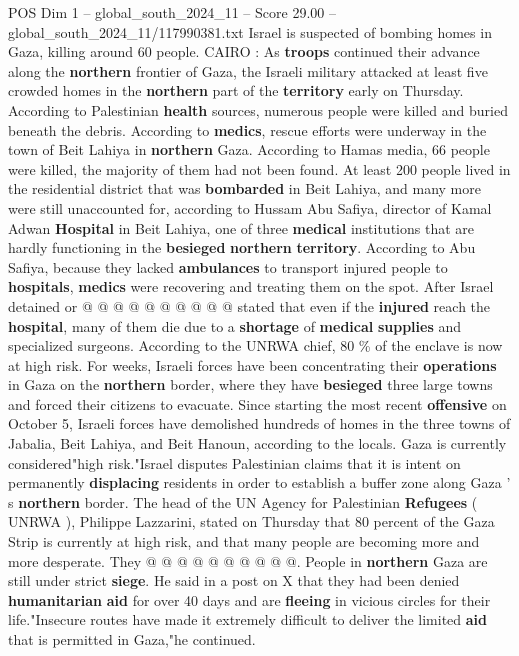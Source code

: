 \begin{textsample}{POS Dim 1 – global\_south\_2024\_11 – Score 29.00 – global\_south\_2024\_11/117990381.txt}  \label{ex:f1_pos_250}
Israel is suspected of bombing homes in Gaza, killing around 60 people.
CAIRO : As \textbf{troops} continued their advance along the \textbf{northern} frontier of Gaza, the Israeli military attacked at least five crowded homes in the \textbf{northern} part of the \textbf{territory} early on Thursday.
According to Palestinian \textbf{health} sources, numerous people were killed and buried beneath the debris.
According to \textbf{medics}, rescue efforts were underway in the town of Beit Lahiya in \textbf{northern} Gaza.
According to Hamas media, 66 people were killed, the majority of them had not been found.
At least 200 people lived in the residential district that was \textbf{bombarded} in Beit Lahiya, and many more were still unaccounted for, according to Hussam Abu Safiya, director of Kamal Adwan \textbf{Hospital} in Beit Lahiya, one of three \textbf{medical} institutions that are hardly functioning in the \textbf{besieged} \textbf{northern} \textbf{territory}.
According to Abu Safiya, because they lacked \textbf{ambulances} to transport injured people to \textbf{hospitals}, \textbf{medics} were recovering and treating them on the spot.
After Israel detained or @ @ @ @ @ @ @ @ @ @ stated that even if the \textbf{injured} reach the \textbf{hospital}, many of them die due to a \textbf{shortage} of \textbf{medical} \textbf{supplies} and specialized surgeons.
According to the UNRWA chief, 80 \% of the enclave is now at high risk.
For weeks, Israeli forces have been concentrating their \textbf{operations} in Gaza on the \textbf{northern} border, where they have \textbf{besieged} three large towns and forced their citizens to evacuate.
Since starting the most recent \textbf{offensive} on October 5, Israeli forces have demolished hundreds of homes in the three towns of Jabalia, Beit Lahiya, and Beit Hanoun, according to the locals.
Gaza is currently considered"high risk."Israel disputes Palestinian claims that it is intent on permanently \textbf{displacing} residents in order to establish a buffer zone along Gaza ' s \textbf{northern} border.
The head of the UN Agency for Palestinian \textbf{Refugees} ( UNRWA ), Philippe Lazzarini, stated on Thursday that 80 percent of the Gaza Strip is currently at high risk, and that many people are becoming more and more desperate.
They @ @ @ @ @ @ @ @ @ @.
People in \textbf{northern} Gaza are still under strict \textbf{siege}.
He said in a post on X that they had been denied \textbf{humanitarian} \textbf{aid} for over 40 days and are \textbf{fleeing} in vicious circles for their life."Insecure routes have made it extremely difficult to deliver the limited \textbf{aid} that is permitted in Gaza,"he continued.

\end{textsample}
